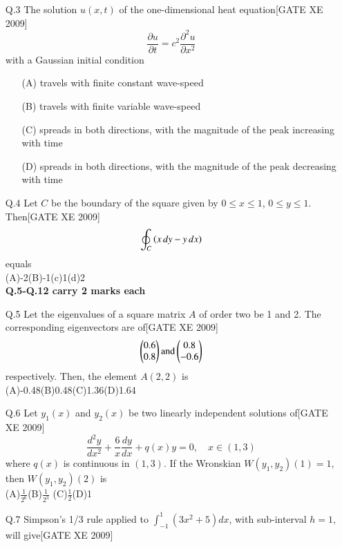 \documentclass[journal,12pt,onecolumn]{IEEEtran}
\theoremstyle{remark}
\begin{document}
\begin{enumerate}
   
    \item[Q.3] The solution $u(x,t)$ of the one-dimensional heat equation\hfill[GATE XE 2009]
    $$
        \frac{\partial u}{\partial t} = c^2 \frac{\partial^2 u}{\partial x^2}
    $$
    with a Gaussian initial condition
    \begin{enumerate}
        \item[(A)] travels with finite constant wave-speed
        \item[(B)] travels with finite variable wave-speed
        \item[(C)] spreads in both directions, with the magnitude of the peak increasing with time
        \item[(D)] spreads in both directions, with the magnitude of the peak decreasing with time
    \end{enumerate}

    \item[Q.4] Let $C$ be the boundary of the square given by $0 \leq x \leq 1$, $0 \leq y \leq 1$. Then\hfill[GATE XE 2009]
    $$
        \oint_C \left(x\,dy - y\,dx\right)
    $$equals
    \\
    (A)-2\hfill(B)-1\hfill(c)1\hfill(d)2\\

\textbf{Q.5-Q.12 carry 2 marks each}
    \item[Q.5] Let the eigenvalues of a square matrix $A$ of order two be 1 and 2. The corresponding eigenvectors are of\hfill[GATE XE 2009]
    $$
        \begin{pmatrix} 0.6 \\ 0.8\end{pmatrix}  \text{and}  \begin{pmatrix} 0.8 \\ -0.6 \end{pmatrix}
    $$
    respectively. Then, the element $A(2,2)$ is\\
    (A)-0.48\hfill(B)0.48\hfill(C)1.36\hfill(D)1.64

    \item[Q.6] Let $y_1(x)$ and $y_2(x)$ be two linearly independent solutions of\hfill[GATE XE 2009]
    $$
        \frac{d^2 y}{dx^2} + \frac{6}{x}\frac{dy}{dx} + q(x)y = 0, \quad x \in (1,3)
    $$
    where $q(x)$ is continuous in $(1,3)$. If the Wronskian $W(y_1,y_2)(1) = 1$, then $W(y_1,y_2)(2)$ is\\
    (A)$\frac{1}{2^6}$\hfill(B)$\frac{1}{2^3}$ \hfill(C)$\frac{1}{2}$\hfill(D)1

\item[Q.7] Simpson's 1/3 rule applied to $\int_{-1}^1 (3x^2 + 5)dx$, with sub-interval $h=1$, will give\hfill[GATE XE 2009]
\begin{enumerate}
\begin{multicols}{2}


\end{multicols}
\end{enumerate}
\end{enumerate}
\end{document}
